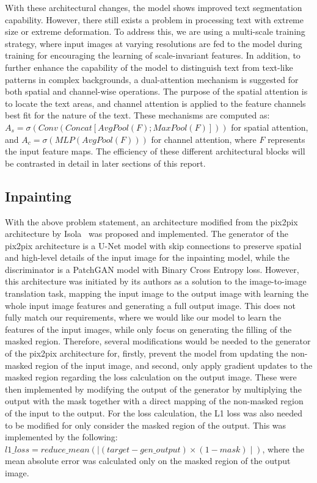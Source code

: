 \documentclass[10pt,twocolumn,letterpaper]{article}
\begin{document}
With these architectural changes, the model shows improved text segmentation capability. However, there still exists a problem 
in processing text with extreme size or extreme deformation. To address this, we are using a multi-scale training strategy, where input images at varying resolutions 
are fed to the model during training for encouraging the learning of scale-invariant features. In addition, to further enhance the capability of the model 
to distinguish text from text-like patterns in complex backgrounds, a dual-attention mechanism is suggested for both spatial and channel-wise operations. 
The purpose of the spatial attention is to locate the text areas, and channel attention is applied to the feature channels best fit for the nature of the text. 
These mechanisms are computed as: $A_s = \sigma(Conv(Concat[AvgPool(F); MaxPool(F)]))$ for spatial attention, and $A_c = \sigma(MLP(AvgPool(F)))$ 
for channel attention, where $F$ represents the input feature maps. The efficiency of these different architectural blocks will be contrasted 
in detail in later sections of this report.

\subsection{Inpainting}

With the above problem statement, an architecture modified from the pix2pix architecture by Isola~\etal\cite{Isola2018} was proposed and implemented. The generator of the pix2pix architecture is
a U-Net model with skip connections to preserve spatial and high-level details of the input image for the inpainting model, while the discriminator is a PatchGAN
model with Binary Cross Entropy loss. However, this architecture was initiated by its authors as a solution to the image-to-image translation task, mapping the input image to the output image 
with learning the whole input image features and generating a full output image. This does not fully match our requirements, where we would like our model to learn the features of the input images, 
while only focus on generating the filling of the masked region. Therefore, several modifications would be needed to the generator of the pix2pix architecture for, firstly, prevent the model from updating
the non-masked region of the input image, and second, only apply gradient updates to the masked region regarding the loss calculation on the output image. These were then implemented by modifying 
the output of the generator by multiplying the output with the mask together with a direct mapping of the non-masked region of the input to the output. For the loss calculation, the L1 loss was 
also needed to be modified for only consider the masked region of the output. This was implemented by the following: $l1\_loss = reduce\_mean(\mid(target - gen\_output) \times (1 - mask)\mid)$, 
where the mean absolute error was calculated only on the masked region of the output image.
\end{document}
